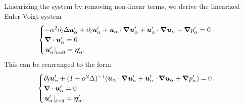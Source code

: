 Linearizing the system by removing non-linear terms, we derive the linearized Euler-Voigt system
$$\begin{cases}
      -\alpha^2\partial_t\Delta \upa + \partial_t\upa + \ua\cdot\bn \upa +\upa\cdot\bn \ua + \bn \ppa = 0\\
      \bn\cdot \upa = 0\\
      \left.\upa\right\vert_{t=0} = \bepa.\\
    \end{cases}$$
This can be rearranged to the form
\begin{equation*}
\begin{cases}
      \partial_t \upa+(I-\alpha^2\Delta)^{-1}(\ua\cdot\bn \upa+\upa\cdot\bn \ua+\bn \ppa)=0\\
      \bn\cdot \upa = 0\\
      \left.\upa\right\vert_{t=0} = \bepa.\\
    \end{cases}
\end{equation*}